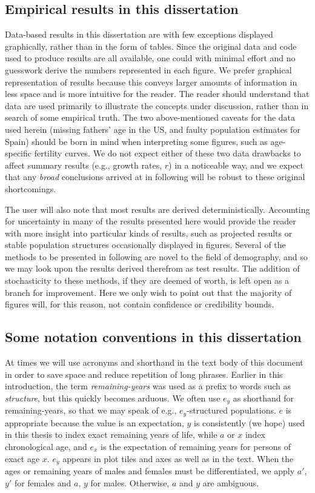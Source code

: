 \subsection{Empirical results in this dissertation}

Data-based results in this dissertation are with few exceptions displayed
graphically, rather than in the form of tables. Since the original data and
code used to produce results are all available, one could with minimal effort
and no guesswork derive the numbers represented in each figure. We prefer
graphical representation of results because this conveys larger amounts of
information in less space and is more intuitive for the reader. The reader
should understand that data are used primarily to illustrate the concepts under discussion, rather
than in search of some empirical truth. The two
above-mentioned caveats for the data used herein (missing fathers' age in the
US, and faulty population estimates for Spain) should be born in mind when
interpreting some figures, such as age-specific fertility curves. We do not
expect either of these two data drawbacks to affect summary results 
(e.g., growth rates, $r$) in a noticeable way, and we expect that any
\textit{broad} conclusions arrived at in following will be robust to these
original shortcomings. 

The user will also note that most results are derived deterministically.
Accounting for uncertainty in many of the results presented here would provide
the reader with more insight into particular kinds of results, such as projected
results or stable population structures occasionally displayed in figures.
Several of the methods to be presented in following are novel to the field of
demography, and so we may look upon the results derived therefrom as test
results. The addition of stochasticity to these methods, if they are deemed of
worth, is left open as a branch for improvement. Here we only wish to point out
that the majority of figures will, for this reason, not contain confidence or
credibility bounds.

\subsection{Some notation conventions in this dissertation}
At times we will use acronyms and shorthand in the text body of this document in
order to save space and reduce repetition of long phrases. Earlier in this
introduction, the term \textit{remaining-years} was used as a prefix to words
such as \textit{structure}, but this quickly becomes arduous. We often use $e_y$
as shorthand for remaining-years, so that we may speak of e.g., $e_y$-structured
populations. $e$ is appropriate because the value is an expectation, $y$ is
consistently (we hope) used in this thesis to index exact remaining years of
life, while $a$ or $x$ index chronological age, and $e_x$ is the expectation of 
remaining years for persons of exact age $x$. $e_y$ appears in plot tiles and
axes as well as in the text. When the ages or remaining years of males and
females must be differentiated, we apply $a'$, $y'$ for females and $a$, $y$ for
males. Otherwise, $a$ and $y$ are ambiguous.

